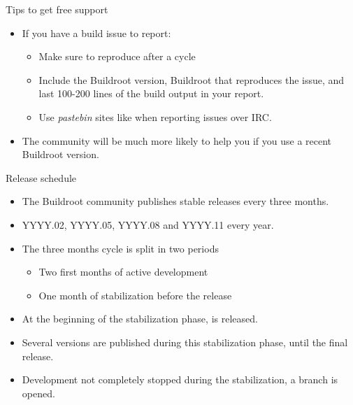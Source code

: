 \begin{frame}{Tips to get free support}
  \begin{itemize}
  \item If you have a build issue to report:
    \begin{itemize}
    \item Make sure to reproduce after a  cycle
    \item Include the Buildroot version, Buildroot  that
      reproduces the issue, and last 100-200 lines of the build
      output in your report.
    \item Use {\em pastebin} sites like 
      when reporting issues over IRC.
    \end{itemize}
  \item The community will be much more likely to help you if you use
    a recent Buildroot version.
  \end{itemize}
\end{frame}

\begin{frame}{Release schedule}
  \begin{itemize}
  \item The Buildroot community publishes stable releases every three
    months.
  \item YYYY.02, YYYY.05, YYYY.08 and YYYY.11 every year.
  \item The three months cycle is split in two periods
    \begin{itemize}
    \item Two first months of active development
    \item One month of stabilization before the release
    \end{itemize}
  \item At the beginning of the stabilization phase,  is
    released.
  \item Several  versions are published during this
    stabilization phase, until the final release.
  \item Development not completely stopped during the stabilization, a
     branch is opened.
  \end{itemize}
\end{frame}


